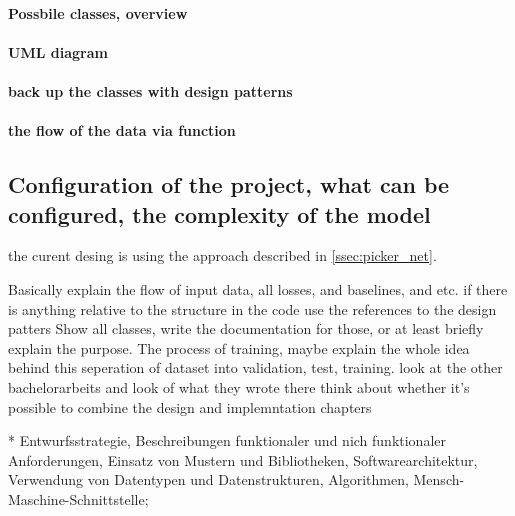 \paragraph{Possbile classes, overview}
\paragraph{UML diagram}
\paragraph{back up the classes with design patterns}

\paragraph{the flow of the data via function}


\subsection{Configuration of the project, what can be configured, the complexity of the model}





the curent desing is using the approach
described in \autoref{ssec:picker_net}.

Basically explain the flow of input data, all losses, and baselines, and etc.
if there is anything relative to the structure in the code use the references to the design patters
Show all classes, write the documentation for those, or at least briefly explain the purpose.
The process of training, maybe explain the whole idea behind this
	seperation of dataset into validation, test, training.
look at the other bachelorarbeits and look of what they wrote there
think about whether it's possible to combine the design and implemntation chapters



* Entwurfsstrategie, Beschreibungen funktionaler und nich
 funktionaler Anforderungen, Einsatz von Mustern und
 Bibliotheken, Softwarearchitektur, Verwendung von Datentypen und
 Datenstrukturen, Algorithmen, Mensch-Maschine-Schnittstelle;
